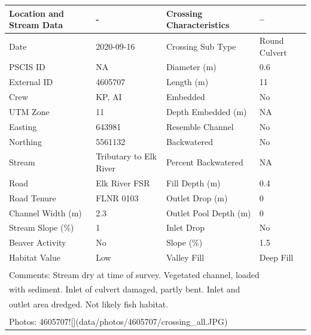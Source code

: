 \documentclass[
]{book}
\begin{document}
\begin{tabular}{l|l|l|l}
\hline
Location and Stream Data & - & Crossing Characteristics & --\\
\hline
Date & 2020-09-16 & Crossing Sub Type & Round Culvert\\
\hline
PSCIS ID & NA & Diameter (m) & 0.6\\
\hline
External ID & 4605707 & Length (m) & 11\\
\hline
Crew & KP, AI & Embedded & No\\
\hline
UTM Zone & 11 & Depth Embedded (m) & NA\\
\hline
Easting & 643981 & Resemble Channel & No\\
\hline
Northing & 5561132 & Backwatered & No\\
\hline
Stream & Tributary to Elk River & Percent Backwatered & NA\\
\hline
Road & Elk River FSR & Fill Depth (m) & 0.4\\
\hline
Road Tenure & FLNR 0103 & Outlet Drop (m) & 0\\
\hline
Channel Width (m) & 2.3 & Outlet Pool Depth (m) & 0\\
\hline
Stream Slope (\%) & 1 & Inlet Drop & No\\
\hline
Beaver Activity & No & Slope (\%) & 1.5\\
\hline
Habitat Value & Low & Valley Fill & Deep Fill\\
\hline
\multicolumn{4}{l}{\textsuperscript{} Comments: Stream dry at time of survey. Vegetated channel, loaded}\\
\multicolumn{4}{l}{with sediment. Inlet of culvert damaged, partly bent. Inlet and}\\
\multicolumn{4}{l}{outlet area dredged. Not likely fish habitat.}\\
\multicolumn{4}{l}{\textsuperscript{} Photos: 4605707![](data/photos/4605707/crossing\_all.JPG)}\\
\end{tabular}
\end{document}
